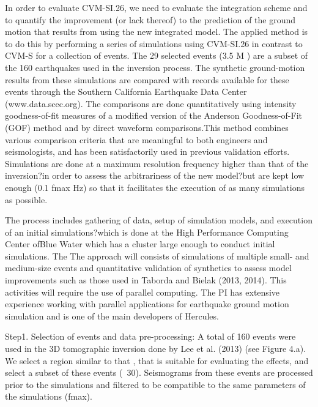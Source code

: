 \documentclass[10pt]{article}
\begin{document}
In order to evaluate CVM-SI.26,
we need to evaluate the integration scheme and to quantify the improvement (or lack thereof) to the prediction
of the ground motion that results from using the new integrated model. The applied method is to do this
by performing a series of simulations using CVM-SI.26 in contrast to CVM-S for a collection of events. The 29 selected events (3.5 \le M ) are a subset of the 160 earthquakes used in the inversion process. The synthetic ground-motion results
from these simulations are compared with records available for these events through the Southern California
Earthquake Data Center (www.data.scec.org). The comparisons are done quantitatively using intensity goodness-of-fit measures  of a modified version of the Anderson Goodness-of-Fit (GOF) method and by direct waveform comparisons.This method combines various comparison criteria that are meaningful to both engineers and seismologists, and has been satisfactorily used in previous validation efforts.  Simulations are done at a maximum resolution frequency higher
than that of the inversion?in order to assess the arbitrariness of the new model?but are kept low enough (0.1 \le
fmax  Hz) so that it facilitates the execution of as many simulations as possible. \par

The process includes gathering of data, setup of simulation models, and execution of an
initial simulations?which is done at the High Performance Computing Center ofBlue Water which has a cluster large enough to conduct initial simulations. The The approach will consists of simulations of
multiple small- and medium-size events and quantitative validation of synthetics to assess model improvements such as those used in Taborda
and Bielak (2013, 2014).
This activities will require the use of parallel computing. The PI
has extensive experience working with parallel applications for
earthquake ground motion simulation and is one of the main developers
of Hercules. \par

Step1. Selection of events and data pre-processing: A
total of 160 events were used in the 3D tomographic inversion
done by Lee et al. (2013) (see Figure 4.a). We select a region
similar to that , that is suitable for
evaluating the effects, and select a subset of these events
(~30). Seismograms from these events are processed prior to the simulations and filtered to be compatible to
the same parameters of the simulations (fmax). \par
\end{document}
